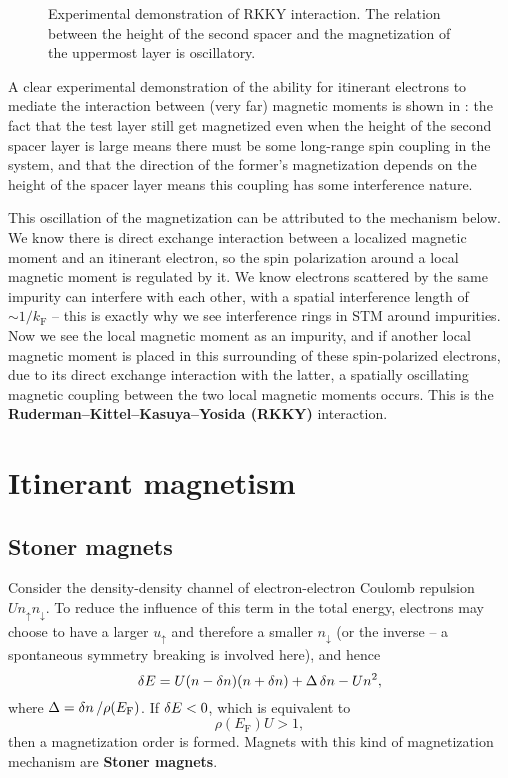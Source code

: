 \documentclass[hyperref, a4paper]{article}
\newcommand*{\concept}[1]{{\textbf{#1}}}
\newcommand*{\efermi}{E_{\text{F}}}
\begin{document}
\begin{figure}
    \centering
    
    \caption{Experimental demonstration of RKKY interaction. 
    The relation between the height of the second spacer 
    and the magnetization of the uppermost layer is oscillatory.}
    \label{fig:rkky-experiment}
\end{figure}

A clear experimental demonstration of the ability for itinerant electrons 
to mediate the interaction between (very far) magnetic moments 
is shown in :
the fact that the test layer still get magnetized 
even when the height of the second spacer layer is large 
means there must be some long-range spin coupling in the system,
and that the direction of the former's magnetization 
depends on the height of the spacer layer 
means this coupling has some interference nature. 

This oscillation of the magnetization can be attributed to the mechanism below.
We know there is direct exchange interaction 
between a localized magnetic moment and an itinerant electron, 
so the spin polarization around a local magnetic moment 
is regulated by it. 
We know electrons scattered by the same impurity can interfere with each other, 
with a spatial interference length of $\sim 1 / k_{\text{F}}$ -- 
this is exactly why we see interference rings in STM around impurities. 
Now we see the local magnetic moment as an impurity,
and if another local magnetic moment 
is placed in this surrounding of these spin-polarized electrons, 
due to its direct exchange interaction with the latter, 
a spatially oscillating magnetic coupling between the two local magnetic moments occurs. 
This is the \concept{Ruderman–Kittel–Kasuya–Yosida (RKKY)} interaction. 

\section{Itinerant magnetism}

\subsection{Stoner magnets}

Consider the density-density channel of electron-electron Coulomb repulsion $U n_\uparrow n_\downarrow$. 
To reduce the influence of this term in the total energy, 
electrons may choose to have a larger $u_\uparrow$ and therefore a smaller $n_{\downarrow}$
(or the inverse -- a spontaneous symmetry breaking is involved here),
and hence 
\begin{equation}
    \var{E} = U (n - \var{n}) (n + \var{n}) + \Delta \var{n} - U n^2,
\end{equation}
where $\Delta = \var{n} / \rho(\efermi)$.
If $\var{E} < 0$, which is equivalent to 
\begin{equation}
    \rho(\efermi) U > 1,
\end{equation}
then a magnetization order is formed. 
Magnets with this kind of magnetization mechanism 
are \concept{Stoner magnets}.
\end{document}
